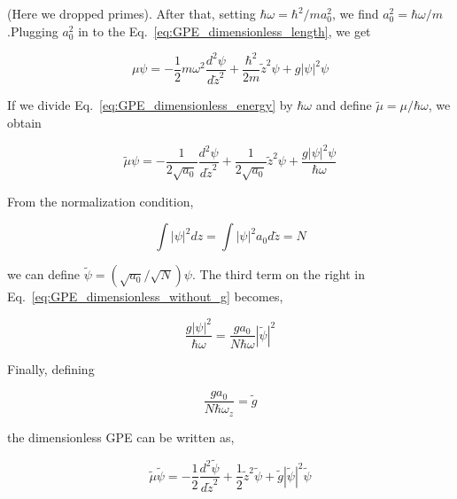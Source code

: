 \documentclass[a4paper,times,12pt]{article}
\begin{document}
\noindent (Here we dropped primes). After that, setting $\hbar\omega = {\hbar^2}/{m a_0^2}$, we find $a_0^2 = \hbar\omega/m$ .Plugging $a_0^2$ in to the Eq.~\eqref{eq:GPE_dimensionless_length}, we get

\begin{equation}
\label{eq:GPE_dimensionless_energy}
\mu\psi = -\frac{1}{2}m\omega^2\frac{d^2\psi}{d\widetilde{z}^2} + \frac{\hbar^2}{2m}\widetilde{z}^2\psi + g|\psi|^2\psi
\end{equation}

\noindent If we divide Eq.~\eqref{eq:GPE_dimensionless_energy} by $\hbar\omega$ and define $\widetilde{\mu} = \mu/\hbar\omega$, we obtain

\begin{equation}
\label{eq:GPE_dimensionless_without_g}
\widetilde{\mu} \psi = -\frac{1}{2\sqrt{a_0}}\frac{d^2\psi}{d\widetilde{z}^2} + \frac{1}{2\sqrt{a_0}}\widetilde{z}^2\psi + \frac{g|\psi|^2\psi}{\hbar\omega}
\end{equation}

\noindent From the normalization condition,

\begin{equation}
\int |\psi|^2dz = \int |\psi|^2 a_0 d\widetilde{z} = N
\end{equation}

\noindent we can define $\widetilde{\psi} = ({\sqrt{a_0}}/{\sqrt{N}})\psi$. The third term on the right in Eq.~\eqref{eq:GPE_dimensionless_without_g} becomes,

\begin{equation}
\label{eq:GPE_dimensionless_g_1}
\frac{g|\psi|^2}{\hbar\omega} = \frac{g a_0}{N\hbar\omega}|\widetilde{\psi}|^2 
\end{equation}

\noindent Finally, defining

\begin{equation}
\label{eq:GPE_dimensionless_g_2}
\frac{g a_0}{N\hbar\omega_z} = \widetilde{g}
\end{equation}

\noindent the dimensionless GPE can be written as,

\begin{equation}
\label{eq:GPE_dimensionless}
\widetilde{\mu} \widetilde{\psi} = -\frac{1}{2}\frac{d^2\widetilde{\psi}}{d\widetilde{z}^2} + \frac{1}{2}\widetilde{z}^2\widetilde{\psi} + \widetilde{g}|\widetilde{\psi}|^2 \widetilde{\psi}
\end{equation}
\end{document}
